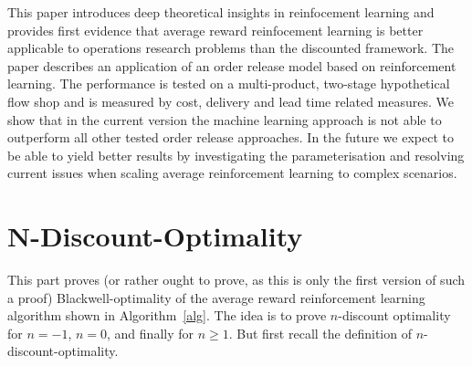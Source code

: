\documentclass[envcountsame]{llncs}
\begin{document}
This paper introduces deep theoretical insights in reinfocement learning and provides first evidence
that average reward reinfocement learning is better applicable to operations research problems than
the discounted framework.
The paper describes an %
application of an order release model based on reinforcement learning. The performance is tested on
a multi-product, two-stage hypothetical flow shop and is measured by cost, delivery and lead time
related measures. We show that in the current version the machine learning approach is not able to
outperform all other tested order release
approaches. %
In the future we expect to be able to yield better results by investigating the parameterisation and
resolving current issues when scaling average reinforcement learning to complex scenarios.





\vfill
\pagebreak
\appendix


\section{N-Discount-Optimality}
\label{sec:methods}

This part proves (or rather ought to prove, as this is only the first version of such a proof)
Blackwell-optimality of the average reward reinforcement learning algorithm shown in
Algorithm~\ref{alg}. The idea is to prove \(n\)-discount optimality for \(n=-1\), \(n=0\), and
finally for \(n \geqslant 1\). But first recall the definition of \(n\)-discount-optimality.
\end{document}
